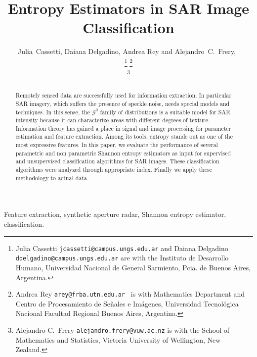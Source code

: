 \documentclass[journal]{IEEEtran}
\begin{document}
	
	\title{Entropy Estimators in SAR Image Classification}
	\author{ Julia~Cassetti, Daiana Delgadino, Andrea Rey and Alejandro~C.~Frery,~
		
		
		\thanks{Julia Cassetti \texttt{jcassetti@campus.ungs.edu.ar} and Daiana Delgadino \texttt{ddelgadino@campus.ungs.edu.ar} are with the  Instituto de Desarrollo Humano, Universidad Nacional de General Sarmiento, Pcia. de Buenos Aires, Argentina.}
		\thanks{Andrea Rey \texttt{arey@frba.utn.edu.ar } is with Mathematics Department and Centro de Procesamiento de Señales e Imágenes, Universidad Tecnológica Nacional Facultad Regional Buenos Aires, Argentina.}
		
		\thanks{Alejandro C.\ Frery \texttt{alejandro.frery@vuw.ac.nz} is with the School of Mathematics and Statistics, Victoria University of Wellington, New Zealand.} 
	}
	
	\maketitle
	
	\begin{abstract}
		
		Remotely sensed data are successfully used for information extraction. 
		In particular SAR imagery, which suffers the presence of speckle noise, needs special models and techniques. 
		In this sense, the $\mathcal G^0$ family of distributions is a suitable model for SAR intensity because it can characterize areas with different degrees of texture. 
		Information theory has gained a place in signal and image processing for parameter estimation and feature extraction.
		Among its tools, entropy stands out as one of the most expressive features.
		In this paper, we evaluate the performance of several parametric and non parametric Shannon entropy estimators as input for supervised and unsupervised classification algorithms for SAR images.
		These classification algorithms were analyzed through appropriate index. Finally we apply these methodology to actual data.
		
	\end{abstract}
	
	\begin{IEEEkeywords}
		Feature extraction, synthetic aperture radar, Shannon entropy estimator, classification.
	\end{IEEEkeywords}
	
\end{document}
